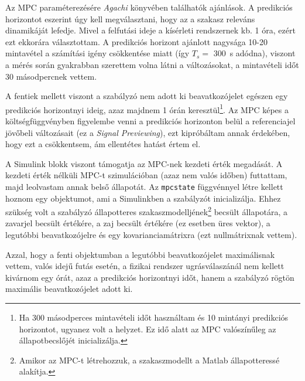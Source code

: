 Az MPC paraméterezésére \textit{Agachi \cite{romanMPC_Agachi}} könyvében találhatók ajánlások. A predikciós horizontot eszerint úgy kell megválasztani, hogy az a szakasz releváns dinamikáját lefedje. Mivel a felfutási ideje a kísérleti rendszernek kb. 1 óra, ezért ezt ekkorára választottam. A predikciós horizont ajánlott nagysága 10-20 mintavétel a számítási igény csökkentése miatt (így $T_s =$ \SI{300}{\second} adódna),  viszont a mérés során gyakrabban szerettem volna látni a változásokat, a mintavételi időt 30 másodpercnek vettem.

A fentiek mellett viszont a szabályzó nem adott ki beavatkozójelet egészen egy predikciós horizontnyi ideig, azaz majdnem 1 órán keresztül\footnote{Ha 300 másodperces mintavételi időt használtam és 10 mintányi predikciós horizontot, ugyanez volt a helyzet. Ez idő alatt az MPC valószínűleg az állapotbecslőjét inicializálja.}. Az MPC képes a költségfüggvényben figyelembe venni a predikciós horizonton belül a referenciajel jövőbeli változásait (ez a \textit{Signal Previewing}), ezt kipróbáltam annak érdekében, hogy ezt a  csökkentsem, ám ellentétes hatást értem el.

A Simulink blokk viszont támogatja az MPC-nek kezdeti érték megadását. A kezdeti érték nélküli MPC-t szimulációban (azaz nem valós időben) futtattam, majd leolvastam annak belső állapotát. Az \verb|mpcstate| függvénnyel létre kellett hoznom egy objektumot, ami a Simulinkben a szabályzót inicializálja. Ehhez szükség volt a szabályzó állapotteres szakaszmodelljének\footnote{Amikor az MPC-t létrehozzuk, a szakaszmodellt a Matlab állapotteressé alakítja.} becsült állapotára, a zavarjel becsült értékére, a zaj becsült értékére (ez esetben üres vektor), a legutóbbi beavatkozójelre és egy kovarianciamátrixra (ezt nullmátrixnak vettem).

Azzal, hogy a fenti objektumban a legutóbbi beavatkozójelet maximálisnak vettem, valós idejű futás esetén, a fizikai rendszer ugrásválaszánál nem kellett kivárnom egy órát, azaz a predikciós horizontnyi időt, hanem a szabályzó rögtön maximális beavatkozójelet adott ki.


